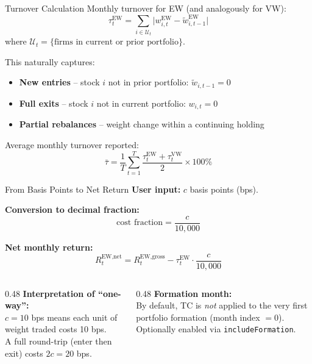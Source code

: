 \documentclass[aspectratio=169, 12pt]{beamer}
\begin{document}
\begin{frame}{Turnover Calculation}
  Monthly turnover for EW (and analogously for VW):
  \[
    \tau_t^{\text{EW}} = \sum_{i \in \mathcal{U}_t} \bigl|w_{i,t}^{\text{EW}} - \tilde{w}_{i,t-1}^{\text{EW}}\bigr|
  \]
  where $\mathcal{U}_t = \{\text{firms in current or prior portfolio}\}$.

  \medskip
  This naturally captures:
  \begin{itemize}
    \item \textbf{New entries} -- stock $i$ not in prior portfolio: $\tilde{w}_{i,t-1} = 0$
    \item \textbf{Full exits} -- stock $i$ not in current portfolio: $w_{i,t} = 0$
    \item \textbf{Partial rebalances} -- weight change within a continuing holding
  \end{itemize}

  Average monthly turnover reported:
  \[
    \bar{\tau} = \frac{1}{T}\sum_{t=1}^{T} \frac{\tau_t^{\text{EW}} + \tau_t^{\text{VW}}}{2} \times 100\%
  \]
\end{frame}

\begin{frame}{From Basis Points to Net Return}
  \textbf{User input:} $c$ basis points (bps).

  \medskip
  \textbf{Conversion to decimal fraction:}
  \[
    \text{cost fraction} = \frac{c}{10{,}000}
  \]

  \textbf{Net monthly return:}
  \[
    R_t^{\text{EW,net}} = R_t^{\text{EW,gross}} - \tau_t^{\text{EW}} \cdot \frac{c}{10{,}000}
  \]

  \medskip
  \begin{columns}[T]
    \begin{column}{0.48\textwidth}
      \textbf{Interpretation of ``one-way'':}\\
      $c = 10$ bps means each unit of weight traded costs 10 bps.\\
      A full round-trip (enter then exit) costs $2c = 20$ bps.
    \end{column}
    \begin{column}{0.48\textwidth}
      \textbf{Formation month:}\\
      By default, TC is \emph{not} applied to the very first portfolio formation (month index $= 0$).\\
      Optionally enabled via \texttt{includeFormation}.
    \end{column}
  \end{columns}
\end{frame}
\end{document}
